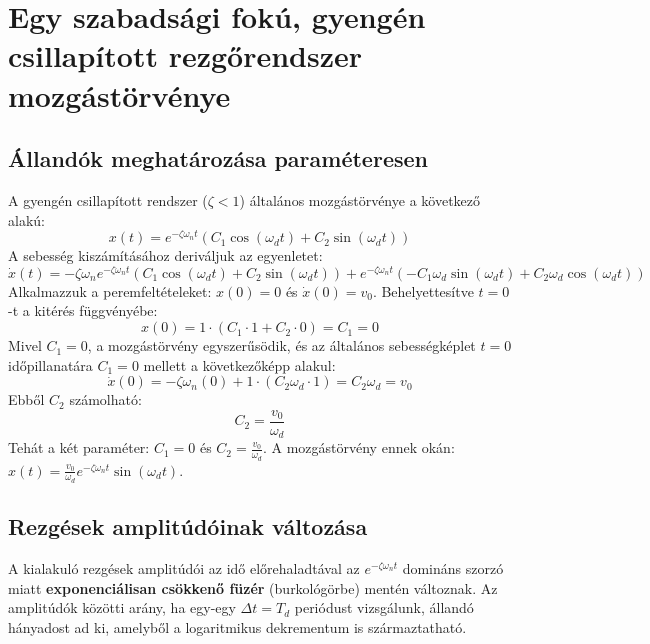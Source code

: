 \section{Egy szabadsági fokú, gyengén csillapított rezgőrendszer mozgástörvénye}

\subsection*{Állandók meghatározása paraméteresen}
A gyengén csillapított rendszer ($\zeta < 1$) általános mozgástörvénye a következő alakú:
\begin{equation}
    x(t) = e^{-\zeta\omega_n t} \left( C_1 \cos(\omega_d t) + C_2 \sin(\omega_d t) \right)
\end{equation}
A sebesség kiszámításához deriváljuk az egyenletet:
\begin{equation}
    \dot{x}(t) = -\zeta\omega_n e^{-\zeta\omega_n t} \left( C_1 \cos(\omega_d t) + C_2 \sin(\omega_d t) \right) + e^{-\zeta\omega_n t} \left( -C_1 \omega_d \sin(\omega_d t) + C_2 \omega_d \cos(\omega_d t) \right)
\end{equation}
Alkalmazzuk a peremfeltételeket: $x(0) = 0$ és $\dot{x}(0) = v_0$.
Behelyettesítve $t = 0$-t a kitérés függvényébe:
\begin{equation}
    x(0) = 1 \cdot \left( C_1 \cdot 1 + C_2 \cdot 0 \right) = C_1 = 0
\end{equation}
Mivel $C_1 = 0$, a mozgástörvény egyszerűsödik, és az általános sebességképlet $t=0$ időpillanatára $C_1 = 0$ mellett a következőképp alakul:
\begin{equation}
    \dot{x}(0) = -\zeta\omega_n (0) + 1 \cdot \left( C_2 \omega_d \cdot 1 \right) = C_2 \omega_d = v_0
\end{equation}
Ebből $C_2$ számolható:
\begin{equation}
    C_2 = \frac{v_0}{\omega_d}
\end{equation}
Tehát a két paraméter: $C_1 = 0$ és $C_2 = \frac{v_0}{\omega_d}$. A mozgástörvény ennek okán: $x(t) = \frac{v_0}{\omega_d} e^{-\zeta\omega_n t} \sin(\omega_d t)$.

\subsection*{Rezgések amplitúdóinak változása}
A kialakuló rezgések amplitúdói az idő előrehaladtával az $e^{-\zeta\omega_n t}$ domináns szorzó miatt \textbf{exponenciálisan csökkenő füzér} (burkológörbe) mentén változnak. Az amplitúdók közötti arány, ha egy-egy $\Delta t = T_d$ periódust vizsgálunk,  állandó hányadost ad ki, amelyből a logaritmikus dekrementum is származtatható.

